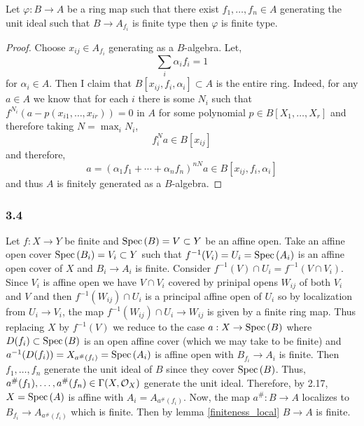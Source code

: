 \documentclass[12pt]{article}
\begin{document}
\begin{enumerate}
\begin{lemma}
Let $\varphi : B \to A$ be a ring map such that there exist $f_1, \dots, f_n \in A$ generating the unit ideal such that $B \to A_{f_i}$ is finite type then $\varphi$ is finite type.
\end{lemma}

\begin{proof}
Choose $x_{ij} \in A_{f_i}$ generating as a $B$-algebra. Let,
\[ \sum_{i} \alpha_i f_i = 1 \]
for $\alpha_i \in A$. Then I claim that $B[x_{ij}, f_i, \alpha_i] \subset A$ is the entire ring. Indeed, for any $a \in A$ we know that for each $i$ there is some $N_i$ such that $f^{N_i} (a - p(x_{i1}, \dots, x_{ir})) = 0$ in $A$ for some polynomial $p \in B[X_1, \dots, X_r]$ and therefore taking $N = \max_i N_i$,
\[ f_i^{N} a \in B[x_{ij}] \]
and therefore,
\[ a = (\alpha_1 f_1 + \cdots + \alpha_n f_n)^{nN} a \in B[x_{ij}, f_i, \alpha_i] \]
and thus $A$ is finitely generated as a $B$-algebra.
\end{proof}
\end{enumerate}

\subsubsection{3.4}

Let $f : X \to Y$ be finite and $\mathrm{Spec}\left( B \right) = V \subset Y$ be an affine open. Take an affine open cover $\mathrm{Spec}\left( B_i \right) = V_i \subset Y$ such that $f^{-1}(V_i) = U_i = \mathrm{Spec}\left( A_i \right)$ is an affine open cover of $X$ and $B_i \to A_i$ is finite. Consider $f^{-1}(V) \cap U_i = f^{-1}(V \cap V_i)$. Since $V_i$ is affine open we have $V \cap V_i$ covered by prinipal opens $W_{ij}$ of both $V_i$ and $V$ and then $f^{-1}(W_{ij}) \cap U_i$ is a principal affine open of $U_i$ so by localization from $U_i \to V_i$, the map $f^{-1}(W_{ij}) \cap U_i \to W_{ij}$ is given by a finite ring map. Thus replacing $X$ by $f^{-1}(V)$ we reduce to the case $a : X \to \mathrm{Spec}\left( B \right)$ where $D(f_i) \subset \mathrm{Spec}\left( B \right)$ is an open affine cover (which we may take to be finite) and $a^{-1}(D(f_i)) = X_{a^\#(f_i)} = \mathrm{Spec}\left( A_i \right)$ is affine open with $B_{f_i} \to A_i$ is finite. Then $f_1, \dots, f_n$ generate the unit ideal of $B$ since they cover $\mathrm{Spec}\left( B \right)$. Thus, $a^\#(f_1), \dots, a^\#(f_n) \in \Gamma(X, \mathcal{O}_{X})$ generate the unit ideal. Therefore, by 2.17, $X = \mathrm{Spec}\left( A \right)$ is affine with $A_i = A_{a^\#(f_i)}$. Now, the map $a^\# : B \to A$ localizes to $B_{f_i} \to A_{a^\#(f_i)}$ which is finite. Then by lemma \ref{finiteness_local} $B \to A$ is finite. 
\end{document}
